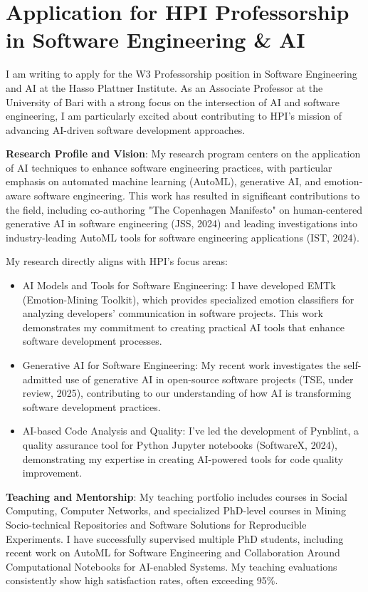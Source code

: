 \section{Application for HPI Professorship in Software Engineering \& AI}

I am writing to apply for the W3 Professorship position in Software Engineering and AI at the 
Hasso Plattner Institute. As an Associate Professor at the University of Bari with a strong focus 
on the intersection of AI and software engineering, I am particularly excited about contributing 
to HPI's mission of advancing AI-driven software development approaches.

\textbf{Research Profile and Vision}:
My research program centers on the application of AI techniques to enhance software engineering practices, with particular emphasis on automated machine learning (AutoML), generative AI, and emotion-aware software engineering. This work has resulted in significant contributions to the field, including co-authoring "The Copenhagen Manifesto" on human-centered generative AI in software engineering (JSS, 2024) and leading investigations into industry-leading AutoML tools for software engineering applications (IST, 2024).

My research directly aligns with HPI's focus areas:
\begin{itemize}
\item AI Models and Tools for Software Engineering: I have developed EMTk (Emotion-Mining Toolkit), which provides specialized emotion classifiers for analyzing developers' communication in software projects. This work demonstrates my commitment to creating practical AI tools that enhance software development processes.
\item Generative AI for Software Engineering: My recent work investigates the self-admitted use of generative AI in open-source software projects (TSE, under review, 2025), contributing to our understanding of how AI is transforming software development practices.
\item AI-based Code Analysis and Quality: I've led the development of Pynblint, a quality assurance tool for Python Jupyter notebooks (SoftwareX, 2024), demonstrating my expertise in creating AI-powered tools for code quality improvement.
\end{itemize}

\textbf{Teaching and Mentorship}:
My teaching portfolio includes courses in Social Computing, Computer Networks, and specialized PhD-level courses in Mining Socio-technical Repositories and Software Solutions for Reproducible Experiments. I have successfully supervised multiple PhD students, including recent work on AutoML for Software Engineering and Collaboration Around Computational Notebooks for AI-enabled Systems. My teaching evaluations consistently show high satisfaction rates, often exceeding 95\%. \par

